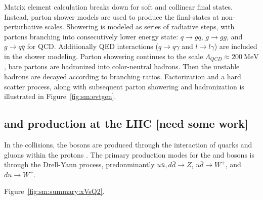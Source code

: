 

Matrix element calculation breaks down for soft and collinear final states. Instead, parton shower models are used to produce the final-states at non-perturbative scales. Showering is modeled as series of radiative steps, with partons branching into consecutively lower energy state: $q\rightarrow gq$, $g\rightarrow gg$, and $g\rightarrow q\bar{q}$ for QCD. Additionally QED interactions ($q\rightarrow q\gamma$ and $l\rightarrow l\gamma$) are included in the shower modeling. Parton showering continues to the scale $\Lambda_{QCD}\approx 200~\mathrm{MeV}$, bare partons are hadronized into color-neutral hadrons. Then the unstable hadrons are decayed according to branching ratios. Factorization and a hard scatter process, along with subsequent parton showering and hadronization is illustrated in Figure~\ref{fig:sm:evtgen}.



\subsection{\W and \Z production at the LHC [need some work]}
In the \pp collisions, the bosons are produced through the interaction of quarks and gluons within the protons \cite{}. The primary production modes for the \W and \Z bosons is through the Drell-Yann process, predonminantly $u\bar{u}, d\bar{d}\rightarrow Z$,  $u\bar{d}\rightarrow W^+$,  and $d\bar{u}\rightarrow W^-$. 

Figure~\ref{fig:sm:summary:xVsQ2}.





